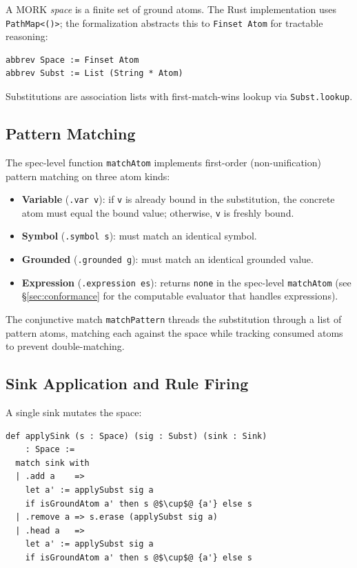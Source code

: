 \documentclass[11pt]{article}
\theoremstyle{definition}
\theoremstyle{remark}
\newcommand{\MORK}{\textup{MORK}}
\begin{document}
A \MORK{} \emph{space} is a finite set of ground atoms.
The Rust implementation uses \texttt{PathMap<()>}; the formalization abstracts
this to \texttt{Finset Atom} for tractable reasoning:

\begin{lstlisting}[caption={Space and substitution (\texttt{Space.lean}).}]
abbrev Space := Finset Atom
abbrev Subst := List (String * Atom)
\end{lstlisting}

Substitutions are association lists with first-match-wins lookup via
\texttt{Subst.lookup}.

\subsection{Pattern Matching}

The spec-level function \texttt{matchAtom} implements first-order
(non-unification) pattern matching on three atom kinds:

\begin{itemize}[nosep]
  \item \textbf{Variable} (\texttt{.var v}): if \texttt{v} is already bound
    in the substitution, the concrete atom must equal the bound value;
    otherwise, \texttt{v} is freshly bound.
  \item \textbf{Symbol} (\texttt{.symbol s}): must match an identical symbol.
  \item \textbf{Grounded} (\texttt{.grounded g}): must match an identical
    grounded value.
  \item \textbf{Expression} (\texttt{.expression es}): returns \texttt{none}
    in the spec-level \texttt{matchAtom} (see \S\ref{sec:conformance} for
    the computable evaluator that handles expressions).
\end{itemize}

\noindent
The conjunctive match \texttt{matchPattern} threads the substitution through
a list of pattern atoms, matching each against the space while tracking
consumed atoms to prevent double-matching.

\subsection{Sink Application and Rule Firing}

A single sink mutates the space:

\begin{lstlisting}[caption={Sink application (\texttt{Space.lean}).}]
def applySink (s : Space) (sig : Subst) (sink : Sink)
    : Space :=
  match sink with
  | .add a    =>
    let a' := applySubst sig a
    if isGroundAtom a' then s @$\cup$@ {a'} else s
  | .remove a => s.erase (applySubst sig a)
  | .head a   =>
    let a' := applySubst sig a
    if isGroundAtom a' then s @$\cup$@ {a'} else s
\end{lstlisting}
\end{document}

